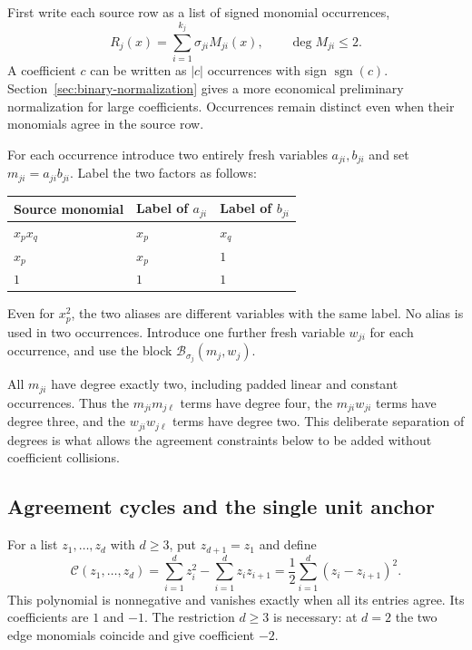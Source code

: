 First write each source row as a list of signed monomial occurrences,
\begin{equation}
 R_j(x)=\sum_{i=1}^{k_j}\sigma_{ji}M_{ji}(x),
 \qquad \deg M_{ji}\le 2.
 \label{eq:unit-rows}
\end{equation}
A coefficient $c$ can be written as $|c|$ occurrences with sign
$\operatorname{sgn}(c)$. Section~\ref{sec:binary-normalization} gives a
more economical preliminary normalization for large coefficients.
Occurrences remain distinct even when their monomials agree in the
source row.

For each occurrence introduce two entirely fresh variables $a_{ji},b_{ji}$
and set $m_{ji}=a_{ji}b_{ji}$. Label the two factors as follows:
\begin{center}
\begin{tabular}{lll}
\toprule
Source monomial & Label of $a_{ji}$ & Label of $b_{ji}$\\
\midrule
$x_p x_q$ & $x_p$ & $x_q$\\
$x_p$ & $x_p$ & $1$\\
$1$ & $1$ & $1$\\
\bottomrule
\end{tabular}
\end{center}
Even for $x_p^2$, the two aliases are different variables with the same
label. No alias is used in two occurrences. Introduce one further fresh
variable $w_{ji}$ for each occurrence, and use the block
$\mathcal B_{\sigma_j}(m_j,w_j)$.

All $m_{ji}$ have degree exactly two, including padded linear and constant
occurrences. Thus the $m_{ji}m_{j\ell}$ terms have degree four,
the $m_{ji}w_{ji}$ terms have degree three, and the $w_{ji}w_{j\ell}$
terms have degree two. This deliberate separation of degrees is what
allows the agreement constraints below to be added without coefficient
collisions.

\subsection{Agreement cycles and the single unit anchor}

For a list $z_1,\ldots,z_d$ with $d\ge3$, put $z_{d+1}=z_1$ and define
\begin{equation}
 \mathcal C(z_1,\ldots,z_d)
   =\sum_{i=1}^d z_i^2-\sum_{i=1}^d z_i z_{i+1}
   =\frac12\sum_{i=1}^d(z_i-z_{i+1})^2.
 \label{eq:cycle}
\end{equation}
This polynomial is nonnegative and vanishes exactly when all its entries
agree. Its coefficients are $1$ and $-1$. The restriction $d\ge3$ is
necessary: at $d=2$ the two edge monomials coincide and give coefficient
$-2$.

